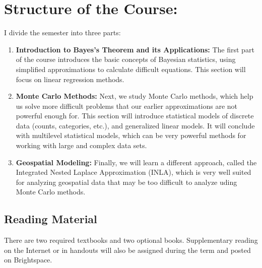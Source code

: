 \documentclass[11pt,twoside]{jgsyllabus}\usepackage[]{graphicx}\usepackage[]{xcolor}
\begin{document}
%
%
%
\iffalse
\section{Important Dates:}
Many of you have athletic and other commitments during the term and may travel
for personal reasons. As you plan for your semester, particularly if you are
purchasing nonrefundable airplane tickets, consult the syllabus.

\fi
%
%
%
%
%
\clearpage
\section[Structure]{Structure of the Course:}
I divide the semester into three parts:
\begin{enumerate}
\item \textbf{Introduction to Bayes's Theorem and its Applications:}
  The first part of the course introduces the basic concepts of Bayesian
  statistics, using simplified approximations to calculate difficult
  equations. This section will focus on linear regression methods.
\item \textbf{Monte Carlo Methods:}
  Next, we study Monte Carlo methods, which help us solve more difficult
  problems that our earlier approximations are not powerful enough for.
  This section will introduce statistical models of discrete data
  (counts, categories, etc.), and generalized linear models. It will conclude
  with multilevel statistical models, which can be very powerful methods for
  working with large and complex data sets.
\item \textbf{Geospatial Modeling:}
  Finally, we will learn a different approach, called the Integrated
  Nested Laplace Approximation (INLA), which is very well suited for
  analyzing geospatial data that may be too difficult to analyze uding
  Monte Carlo methods.
\end{enumerate}

%
%
%
\subsection{Reading Material}
There are two required textbooks and two optional books.
Supplementary reading on the Internet or in handouts will also be assigned
during the term and posted on Brightspace.
\end{document}
